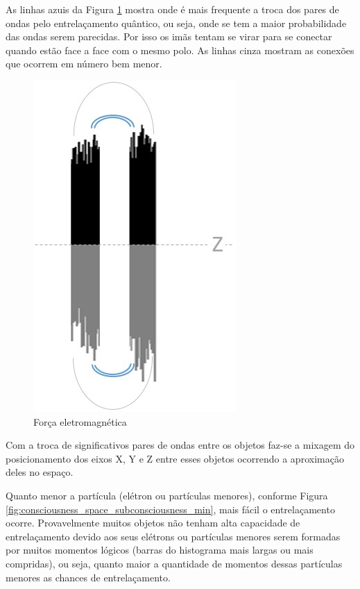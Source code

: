As linhas azuis da Figura \ref{fig:consciousness_electromaagnetic_force} mostra onde é mais frequente a troca dos pares de ondas pelo entrelaçamento quântico, ou seja, onde se tem a maior probabilidade das ondas serem parecidas. Por isso os imãs tentam se virar para se conectar quando estão face a face com o mesmo polo. As linhas cinza mostram as conexões que ocorrem em número bem menor. 
\begin{figure}[H]
\caption{Força eletromagnética}
\label{fig:consciousness_electromaagnetic_force}
\centering
\includegraphics[scale=.8]{sections/images/consciousness_electromaagnetic_force.jpg}
\end{figure}

Com a troca de significativos pares de ondas entre os objetos faz-se a mixagem do posicionamento dos eixos X, Y e Z entre esses objetos ocorrendo a aproximação deles no espaço. 

Quanto menor a partícula (elétron ou partículas menores), conforme Figura \ref{fig:consciousness_space_subconsciousness_min}, mais fácil o entrelaçamento ocorre. Provavelmente muitos objetos não tenham alta capacidade de entrelaçamento devido aos seus elétrons ou partículas menores serem formadas por muitos momentos lógicos (barras do histograma mais largas ou mais compridas), ou seja, quanto maior a quantidade de momentos dessas partículas menores as chances de entrelaçamento.

